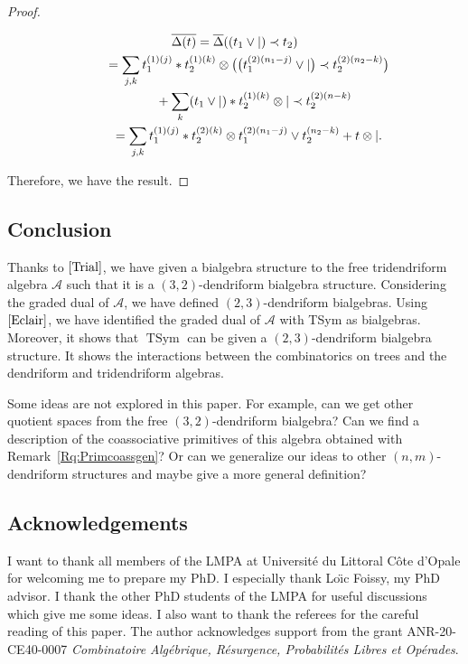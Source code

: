 \documentclass[10pt,a4paper]{amsart}
\numberwithin{equation}{section}
\theoremstyle{definition}
\theoremstyle{plain}
\DeclareMathOperator{\TSym}{TSym}
\begin{document}
\begin{proof}
\begin{itemize}
	\begin{gather*}
		\overline{\Delta(t)}
		 =\overline{\Delta}((t_1\vee |)\prec t_2) \\
		 \hphantom{\overline{\Delta(t)}}{}=\sum_{j,k} t_1^{(1)(j)}* t_2^{(1)(k)}\otimes \big( \big(t_1^{(2)(n_1-j)}\vee |\big)\prec t_2^{(2)(n_2-k)}\big) \\
		 \hphantom{\overline{\Delta(t)=}}{}+\sum_k (t_1\vee |)*t_2^{(1)(k)}\otimes |\prec t_2^{(2)(n-k)} \\
		 \hphantom{\overline{\Delta(t)}}{}=\sum_{j,k} t_1^{(1)(j)}* t_2^{(2)(k)}\otimes t_1^{(2)(n_1-j)}\vee t_2^{(n_2-k)}+t\otimes |.
	\end{gather*}
\end{itemize}
Therefore, we have the result.
\end{proof}


\subsection{Conclusion}

Thanks to $\cite{Trial}$, we have given a bialgebra structure to the free tridendriform algebra $\mathcal{A}$ such that it is a $(3,2)$-dendriform bialgebra structure. Considering the graded dual of $\mathcal{A}$, we have defined $(2,3)$-dendriform bialgebras.
Using $\cite{Eclair}$, we have identified the graded dual of $\mathcal{A}$ with TSym as bialgebras. Moreover, it shows that $\TSym$ can be given a $(2,3)$-dendriform bialgebra structure. It shows the interactions between the combinatorics on trees and the dendriform and tridendriform algebras.

Some ideas are not explored in this paper. For example, can we get other quotient spaces from the free $(3,2)$-dendriform bialgebra? Can we find a description of the coassociative primitives of this algebra obtained with Remark~\ref{Rq:Primcoassgen}? Or can we generalize our ideas to other $(n,m)$-dendriform structures and maybe give a more general definition?

\subsection*{Acknowledgements}

I want to thank all members of the LMPA at Universit\'e du Littoral C\^ote d'Opale for welcoming me to prepare my PhD. I especially thank Lo\"{\i}c Foissy, my PhD advisor.
I thank the other PhD students of the LMPA for useful discussions which give me some ideas. I also want to thank the referees for the careful reading of this paper.
The author acknowledges support from the grant ANR-20-CE40-0007
\emph{Combinatoire Alg\'ebrique, R\'esurgence, Probabilit\'es Libres et Op\'erades}.
\end{document}
